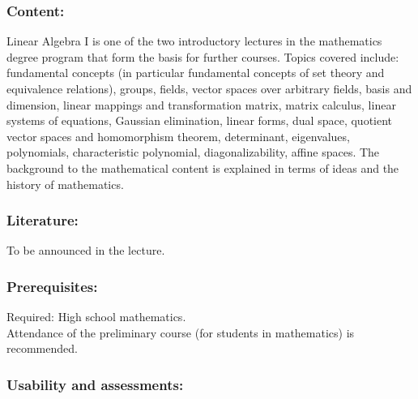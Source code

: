 \documentclass[a4paper,10pt]{article}
\begin{document}
\subsubsection*{\large
    Content:
}
Linear Algebra I is one of the two introductory lectures in the mathematics degree program that form the basis for further courses. Topics covered include: fundamental concepts (in particular fundamental concepts of set theory and equivalence relations), groups, fields, vector spaces over arbitrary fields, basis and dimension, linear mappings and transformation matrix, matrix calculus, linear systems of equations, Gaussian elimination, linear forms, dual space, quotient vector spaces and homomorphism theorem, determinant, eigenvalues, polynomials, characteristic polynomial, diagonalizability, affine spaces. The background to the mathematical content is explained in terms of ideas and the history of mathematics.
\subsubsection*{\large
    Literature:
}
To be announced in the lecture.
\subsubsection*{\large
    Prerequisites:
}
Required: High school mathematics. \\
Attendance of the preliminary course (for students in mathematics) is recommended.
\cleardoublepage
\subsubsection*{\large
    Usability and assessments:
}
\end{document}
